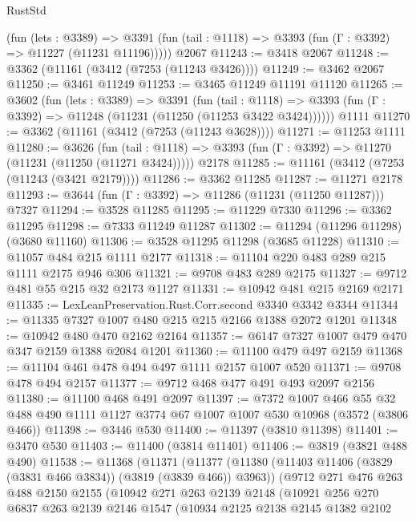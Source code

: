 \begin{lexlean}{RustStd}
\begin{coremodule}
      (fun (lets : @3389) =>
      @3391 (fun (tail : @1118) => @3393 (fun (Γ : @3392) => @11227 (@11231 @11196)))))
    @2067
@11243 := @3418 @2067
@11248 := @3362 (@11161 (@3412 (@7253 (@11243 @3426))))
@11249 := @3462 @2067
@11250 := @3461 @11249
@11253 := @3465 @11249 @11191 @11120
@11265 := @3602
    (fun (lets : @3389) =>
    @3391
      (fun (tail : @1118) =>
      @3393 (fun (Γ : @3392) => @11248 (@11231 (@11250 (@11253 @3422 @3424))))))
    @1111
@11270 := @3362 (@11161 (@3412 (@7253 (@11243 @3628))))
@11271 := @11253 @1111
@11280 := @3626
    (fun (tail : @1118) => @3393 (fun (Γ : @3392) => @11270 (@11231 (@11250 (@11271 @3424)))))
    @2178
@11285 := @11161 (@3412 (@7253 (@11243 (@3421 @2179))))
@11286 := @3362 @11285
@11287 := @11271 @2178
@11293 := @3644 (fun (Γ : @3392) => @11286 (@11231 (@11250 @11287))) @7327
@11294 := @3528 @11285
@11295 := @11229 @7330
@11296 := @3362 @11295
@11298 := @7333 @11249 @11287
@11302 := @11294 (@11296 @11298) (@3680 @11160)
@11306 := @3528 @11295 @11298 (@3685 @11228)
@11310 := @11057 @484 @215 @1111 @2177
@11318 := @11104 @220 @483 @289 @215 @1111 @2175 @946 @306
@11321 := @9708 @483 @289 @2175
@11327 := @9712 @481 @55 @215 @32 @2173 @1127
@11331 := @10942 @481 @215 @2169 @2171
@11335 := LexLeanPreservation.Rust.Corr.second @3340 @3342 @3344
@11344 := @11335 @7327 @1007 @480 @215 @215 @2166 @1388 @2072 @1201
@11348 := @10942 @480 @470 @2162 @2164
@11357 := @6147 @7327 @1007 @479 @470 @347 @2159 @1388 @2084 @1201
@11360 := @11100 @479 @497 @2159
@11368 := @11104 @461 @478 @494 @497 @1111 @2157 @1007 @520
@11371 := @9708 @478 @494 @2157
@11377 := @9712 @468 @477 @491 @493 @2097 @2156
@11380 := @11100 @468 @491 @2097
@11397 := @7372
    @1007
    @466
    @55
    @32
    @488
    @490
    @1111
    @1127
    @3774
    @67
    @1007
    @1007
    @530
    @10968
    (@3572 (@3806 @466))
@11398 := @3446 @530
@11400 := @11397 (@3810 @11398)
@11401 := @3470 @530
@11403 := @11400 (@3814 @11401)
@11406 := @3819 (@3821 @488 @490)
@11538 := @11368
    (@11371
      (@11377
        (@11380 (@11403 @11406 (@3829 (@3831 @466 @3834)) (@3819 (@3839 @466)) @3963))
        (@9712
          @271
          @476
          @263
          @488
          @2150
          @2155
          (@10942
            @271
            @263
            @2139
            @2148
            (@10921
              @256
              @270
              @6837
              @263
              @2139
              @2146
              @1547
              (@10934
                @2125
                @2138
                @2145
                @1382
                @2102

\end{coremodule}
\end{lexlean}
